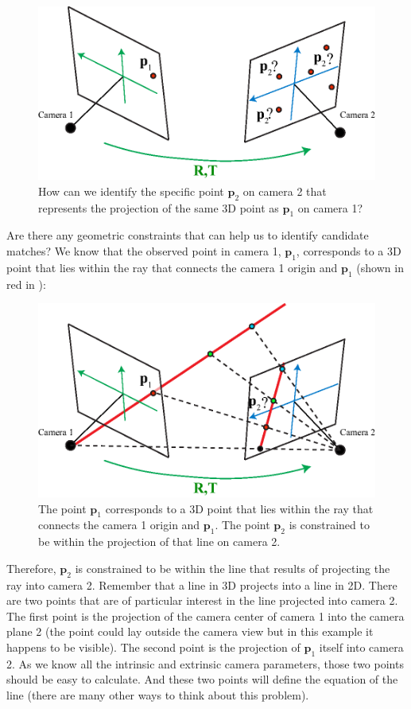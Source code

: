 \begin{figure}[h!]
\centerline{
\includegraphics[width=0.7\linewidth]{figures/3d_scene_understanding/epipolar_1.eps}
}
\caption{How can we identify the specific point $\mathbf{p}_2$ on camera 2 that represents the projection of the same 3D point as $\mathbf{p}_1$ on camera 1?}
\label{fig:epipolar_1}
\end{figure}

Are there any geometric constraints that can help us to identify candidate matches? We know that the observed point in camera 1, $\mathbf{p}_1$, corresponds to a 3D point that lies within the ray that connects the camera 1 origin and $\mathbf{p}_1$ (shown in red in \fig{\ref{fig:epipolar_3}}):

\begin{figure}[h!]
\centerline{
\includegraphics[width=0.7\linewidth]{figures/3d_scene_understanding/epipolar_3.eps}
}
\caption{The point $\mathbf{p}_1$ corresponds to a 3D point that lies within the ray that connects the camera 1 origin and $\mathbf{p}_1$. The point $\mathbf{p}_2$ is constrained to be within the projection of that line on camera 2.}
\label{fig:epipolar_3}
\end{figure}

Therefore, $\mathbf{p}_2$ is constrained to be within the line that results of projecting the ray into camera 2. Remember that a line in 3D projects into a line in 2D. There are two points that are of particular interest in the line projected into camera 2. The first point is the projection of the camera center of camera 1 into the camera plane 2 (the point could lay outside the camera view but in this example it happens to be visible). The second point is the projection of $\mathbf{p}_1$ itself into camera 2. As we know all the intrinsic and extrinsic camera parameters, those two points should be easy to calculate. And these two points will define the equation of the line (there are many other ways to think about this problem). 




